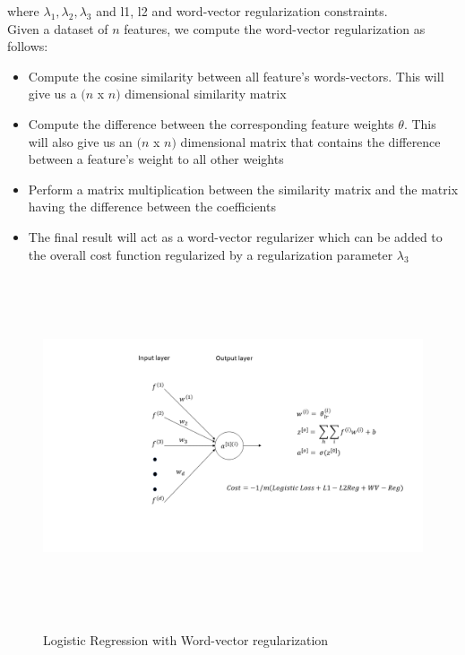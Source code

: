 where $\lambda_{1}, \lambda_{2}, \lambda_{3}$ and l1, l2 and word-vector regularization constraints.\\

\noindent Given a dataset of $n$ features, we compute the word-vector regularization as follows:

\begin{itemize}
\item Compute the cosine similarity between all feature's words-vectors. This will give us a $(n$ x $n)$ dimensional similarity matrix
\item Compute the difference between the corresponding feature weights $\theta$. This will also give us an $(n$ x $n)$ dimensional matrix that contains the difference between a feature's weight to all other weights
\item Perform a matrix multiplication between the similarity matrix and the matrix having the difference between the coefficients
\item The final result will act as a word-vector regularizer which can be added to the overall cost function regularized by a regularization parameter $\lambda_{3}$

\end{itemize}

\newpage

\begin{figure}[htbp]
\centering
\includegraphics[width=16cm, height=10cm]{images/model3.png}\\
\centering
\caption{Logistic Regression with Word-vector regularization}
\label{fig:foo}
\end{figure}

